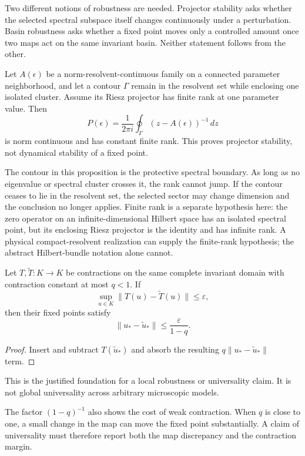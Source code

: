 \documentclass[11pt]{article}
\begin{document}
Two different notions of robustness are needed. Projector stability asks
whether the selected spectral subspace itself changes continuously under a
perturbation. Basin robustness asks whether a fixed point moves only a
controlled amount once two maps act on the same invariant basin. Neither
statement follows from the other.

\begin{proposition}
Let $A(\epsilon)$ be a norm-resolvent-continuous family on a connected
parameter neighborhood, and let a contour $\Gamma$ remain in the resolvent
set while enclosing one isolated cluster. Assume its Riesz projector has
finite rank at one parameter value.
Then
\[
 P(\epsilon)=\frac{1}{2\pi i}\oint_\Gamma(z-A(\epsilon))^{-1}\,dz
\]
is norm continuous and has constant finite rank. This proves projector
stability, not dynamical stability of a fixed point.
\end{proposition}

The contour in this proposition is the protective spectral boundary. As long
as no eigenvalue or spectral cluster crosses it, the rank cannot jump. If the
contour ceases to lie in the resolvent set, the selected sector may change
dimension and the conclusion no longer applies.
Finite rank is a separate hypothesis here: the zero operator on an
infinite-dimensional Hilbert space has an isolated spectral point, but its
enclosing Riesz projector is the identity and has infinite rank. A physical
compact-resolvent realization can supply the finite-rank hypothesis; the
abstract Hilbert-bundle notation alone cannot.

\begin{theorem}\label{thm:robust}
Let $T,\widetilde T:K\to K$ be contractions on the same complete invariant
domain with contraction constant at most $q<1$. If
\[
 \sup_{u\in K}\|T(u)-\widetilde T(u)\|\le\varepsilon,
\]
then their fixed points satisfy
\[
 \|u_\ast-\widetilde u_\ast\|\le\frac{\varepsilon}{1-q}.
\]
\end{theorem}

\begin{proof}
Insert and subtract $T(\widetilde u_\ast)$ and absorb the resulting
$q\|u_\ast-\widetilde u_\ast\|$ term.
\end{proof}

This is the justified foundation for a local robustness or universality
claim. It is not global universality across arbitrary microscopic models.

The factor $(1-q)^{-1}$ also shows the cost of weak contraction. When $q$ is
close to one, a small change in the map can move the fixed point substantially.
A claim of universality must therefore report both the map discrepancy and
the contraction margin.
\end{document}
